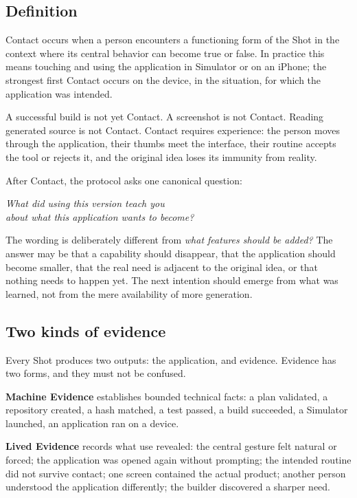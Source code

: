 \documentclass[11pt]{article}
\newenvironment{creed}
  {\begin{center}\begin{minipage}{0.86\textwidth}\itshape\large\centering}
  {\end{minipage}\end{center}\vspace{0.4em}}
\begin{document}
\subsection{Definition}

Contact occurs when a person encounters a functioning form of the Shot
in the context where its central behavior can become true or false. In
practice this means touching and using the application in Simulator or
on an iPhone; the strongest first Contact occurs on the device, in the
situation, for which the application was intended.

A successful build is not yet Contact. A screenshot is not Contact.
Reading generated source is not Contact. Contact requires experience:
the person moves through the application, their thumbs meet the
interface, their routine accepts the tool or rejects it, and the
original idea loses its immunity from reality.

After Contact, the protocol asks one canonical question:

\begin{creed}
What did using this version teach you\\
about what this application wants to become?
\end{creed}

The wording is deliberately different from \emph{what features should be
added?} The answer may be that a capability should disappear, that the
application should become smaller, that the real need is adjacent to the
original idea, or that nothing needs to happen yet. The next intention
should emerge from what was learned, not from the mere availability of
more generation.

\subsection{Two kinds of evidence}

Every Shot produces two outputs: the application, and evidence. Evidence
has two forms, and they must not be confused.

\textbf{Machine Evidence} establishes bounded technical facts: a plan
validated, a repository created, a hash matched, a test passed, a build
succeeded, a Simulator launched, an application ran on a device.

\textbf{Lived Evidence} records what use revealed: the central gesture
felt natural or forced; the application was opened again without
prompting; the intended routine did not survive contact; one screen
contained the actual product; another person understood the application
differently; the builder discovered a sharper need.
\end{document}
